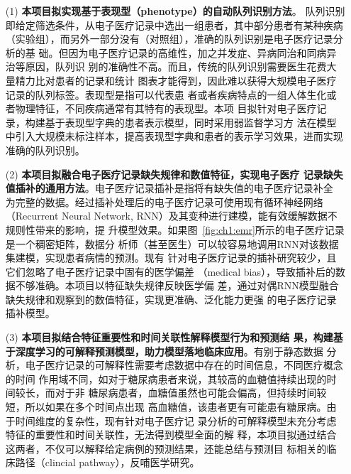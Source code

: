 \begin{itemize}
    \item[(1)] \textbf{本项目拟实现基于表现型（phenotype）的自动队列识别方法}。
    队列识别即给定筛选条件，从电子医疗记录中选出一组患者，其中部分患者有某种疾病
    （实验组），而另外一部分没有（对照组），准确的队列识别是电子医疗记录分析的基
    础。但因为电子医疗记录的高维性，加之并发症、异病同治和同病异治等原因，队列识
    别的准确性不高。而且，传统的队列识别需要医生花费大量精力比对患者的记录和统计
    图表才能得到，因此难以获得大规模电子医疗记录的队列标签。表现型是指可以代表患
    者或者疾病特点的一组人体生化或者物理特征，不同疾病通常有其特有的表现型。本项
    目拟针对电子医疗记录，构建基于表现型字典的患者表示模型，同时采用弱监督学习方
    法在模型中引入大规模未标注样本，提高表现型字典和患者的表示学习效果，进而实现
    准确的队列识别。

    \item[(2)] \textbf{本项目拟融合电子医疗记录缺失规律和数值特征，实现电子医疗
    记录缺失值插补的通用方法}。电子医疗记录插补是指将有缺失值的电子医疗记录补全
    为完整的数据。经过插补处理后的电子医疗记录可使用现有循环神经网络（Recurrent
    Neural Network, RNN）及其变种进行建模，能有效缓解数据不规则性带来的影响，提
    升模型效果。如果图~\ref{fig:ch1:emr}所示的电子医疗记录是一个稠密矩阵，数据分
    析师（甚至医生）可以较容易地调用RNN对该数据集建模，实现患者病情的预测。现有
    针对电子医疗记录的插补研究较少，且它们忽略了电子医疗记录中固有的医学偏差
    （medical bias），导致插补后的数据不够准确。本项目以特征缺失规律反映医学偏
    差，通过对偶RNN模型融合缺失规律和观察到的数值特征，实现更准确、泛化能力更强
    的电子医疗记录插补模型。

    \item[(3)] \textbf{本项目拟结合特征重要性和时间关联性解释模型行为和预测结
    果，构建基于深度学习的可解释预测模型，助力模型落地临床应用}。有别于静态数据
    分析，电子医疗记录的可解释性需要考虑数据中存在的时间信息，不同医疗概念的时间
    作用域不同，如对于糖尿病患者来说，其较高的血糖值持续出现的时间较长，而对于非
    糖尿病患者，血糖值虽然也可能会偏高，但持续时间较短，所以如果在多个时间点出现
    高血糖值，该患者更有可能患有糖尿病。由于时间维度的复杂性，现有针对电子医疗记
    录分析的可解释模型未充分考虑特征的重要性和时间关联性，无法得到模型全面的解
    释，本项目拟通过结合这两者，不仅可以解释给定病例的预测结果，还能总结与预测目
    标相关的临床路径（clincial pathway），反哺医学研究。


\end{itemize}
